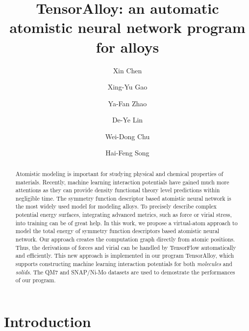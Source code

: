 \documentclass[preprint]{revtex4-2}
\begin{document}
\title{
    TensorAlloy: an automatic atomistic neural network program for alloys
}
\author{Xin Chen}
\author{Xing-Yu Gao}
\author{Ya-Fan Zhao}
\author{De-Ye Lin}
\author{Wei-Dong Chu}
\author{Hai-Feng Song}


\begin{abstract}
Atomistic modeling is important for studying physical and chemical properties of
materials. Recently, machine learning interaction potentials have gained much 
more attentions as they can provide density functional theory level predictions 
within negligible time. The symmetry function descriptor based 
atomistic neural network is the most widely used model for modeling alloys. 
To precisely describe complex potential energy surfaces, integrating advanced 
metrics, such as force or virial stress, into training can be of great help.  
In this work, we propose a virtual-atom approach to model the total energy of 
symmetry function descriptors based atomistic neural network. Our approach 
creates the computation graph directly from atomic positions. Thus, the 
derivations of forces and virial can be handled by TensorFlow automatically and 
efficiently. This new approach is implemented in our program TensorAlloy, which 
supports constructing machine learning interaction potentials for both 
\textit{molecules} and \textit{solids}. The QM7 and SNAP/Ni-Mo datasets are used 
to demostrate the performances of our program.
\end{abstract}

\maketitle

% 
%
\newpage

\section{Introduction}
\end{document}
